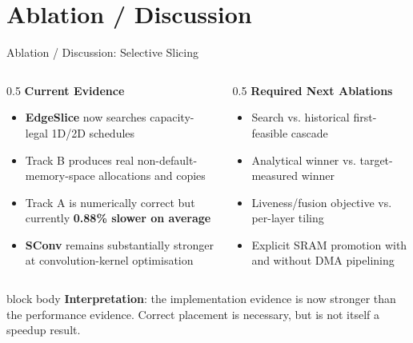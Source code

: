 \documentclass[10pt,aspectratio=169]{beamer}
\begin{document}
\section{Ablation / Discussion}
\begin{frame}{Ablation / Discussion: Selective Slicing}
\begin{columns}
\begin{column}{0.5\textwidth}
\textbf{Current Evidence}
\begin{itemize}
\small
\item \textcolor{edgegreen}{\textbf{EdgeSlice}} now searches capacity-legal 1D/2D schedules
\item Track B produces real non-default-memory-space allocations and copies
\item Track A is numerically correct but currently \textbf{0.88\% slower on average}
\item \textcolor{edgeblue}{\textbf{SConv}} remains substantially stronger at convolution-kernel optimisation
\end{itemize}
\end{column}

\begin{column}{0.5\textwidth}
\textbf{Required Next Ablations}
\begin{itemize}
\small
\item Search vs. historical first-feasible cascade
\item Analytical winner vs. target-measured winner
\item Liveness/fusion objective vs. per-layer tiling
\item Explicit SRAM promotion with and without DMA pipelining
\end{itemize}
\end{column}
\end{columns}

\vspace{0.35cm}
\begin{beamercolorbox}[sep=0.35em,center,rounded=true,shadow=true]{block body}
\small
\textbf{Interpretation}: the implementation evidence is now stronger than the
performance evidence. Correct placement is necessary, but is not itself a
speedup result.
\end{beamercolorbox}
\end{frame}
\end{document}

